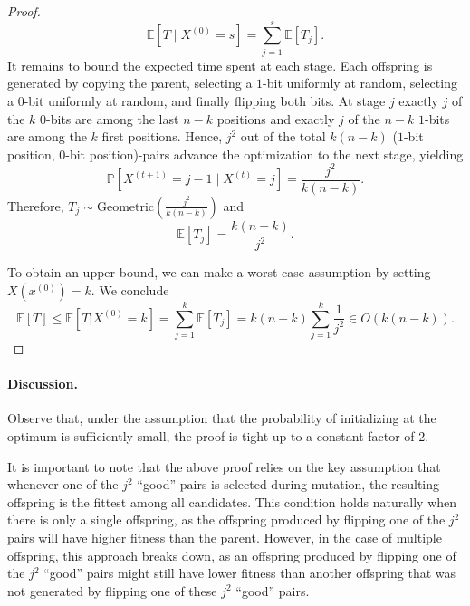\begin{proof}
\begin{displaymath}
    \mathbb{E}[T \;| \;X^{(0)} = s] = \sum_{j=1}^{s} \mathbb{E}[T_j].
\end{displaymath}
It remains to bound the expected time spent at each stage. Each offspring is generated by copying the parent, selecting a $1$-bit uniformly at random, selecting a $0$-bit uniformly at random, and finally flipping both bits. At stage $j$ exactly $j$ of the $k$ $0$-bits are among the last $n-k$ positions and exactly $j$ of the $n-k$ $1$-bits are among the $k$ first positions. Hence, $j^2$ out of the total $k(n-k)$ ($1$-bit position, $0$-bit position)-pairs advance the optimization to the next stage, yielding
\begin{displaymath}
        \mathbb{P}[X^{(t+1)} = j-1 \; | \; X^{(t)}=j] = \frac{j^2}{k(n-k)}.
\end{displaymath}
Therefore, $T_j \sim \text{Geometric}(\frac{j^2}{k(n-k)})$ and
\begin{displaymath}
    \mathbb{E}[T_j] = \frac{k(n-k)}{j^2}.
\end{displaymath}

To obtain an upper bound, we can make a worst-case assumption by setting $X(x^{(0)}) = k$. We conclude
  \begin{displaymath}
      \mathbb{E}[T] \le \mathbb{E}[T | X^{(0)} = k] = \sum_{j=1}^k \mathbb{E}[T_j] = k(n-k) \sum_{j=1}^k \frac{1}{j^2} \in O(k(n-k)).
  \end{displaymath} 
\end{proof}

\paragraph{Discussion.} Observe that, under the assumption that the probability of initializing at the optimum is sufficiently small, the proof is tight up to a constant factor of 2.


It is important to note that the above proof relies on the key assumption that whenever one of the $j^2$ ``good'' pairs is selected during mutation, the resulting offspring is the fittest among all candidates. This condition holds naturally when there is only a single offspring, as the offspring produced by flipping one of the $j^2$ pairs will have higher fitness than the parent. However, in the case of multiple offspring, this approach breaks down, as an offspring produced by flipping one of the $j^2$ ``good'' pairs might still have lower fitness than another offspring that was not generated by flipping one of these $j^2$ ``good'' pairs.


